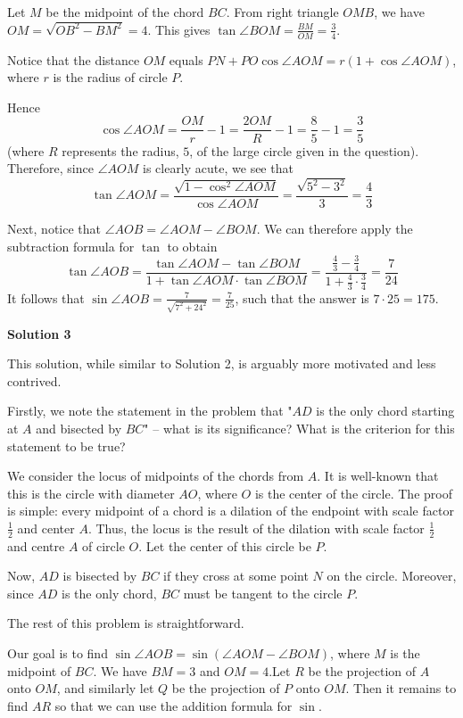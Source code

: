 \begin{enumerate}
 Let $M$ be the midpoint of the chord $BC$. From right triangle $OMB$, we have $OM = \sqrt{OB^2 - BM^2} =4$. This gives $\tan \angle BOM = \frac{BM}{OM} = \frac 3 4$.

 Notice that the distance $OM$ equals $PN + PO \cos \angle AOM = r(1 + \cos \angle AOM)$, where $r$ is the radius of circle $P$. 

 Hence 
 \[\cos \angle AOM = \frac{OM}{r} - 1 = \frac{2OM}{R} - 1 = \frac 8 5 - 1 = \frac 3 5\] (where $R$ represents the radius, $5$, of the large circle given in the question). Therefore, since $\angle AOM$ is clearly acute, we see that 
 \[\tan \angle AOM =\frac{\sqrt{1 - \cos^2 \angle AOM}}{\cos \angle AOM} = \frac{\sqrt{5^2 - 3^2}}{3} = \frac 4 3\]

 Next, notice that $\angle AOB = \angle AOM - \angle BOM$. We can therefore apply the subtraction formula for $\tan$ to obtain 
 \[\tan \angle AOB =\frac{\tan \angle AOM - \tan \angle BOM}{1 + \tan \angle AOM \cdot \tan \angle BOM} =\frac{\frac 4 3 - \frac 3 4}{1 + \frac 4 3 \cdot \frac 3 4} = \frac{7}{24}\] It follows that $\sin \angle AOB =\frac{7}{\sqrt{7^2+24^2}} = \frac{7}{25}$, such that the answer is $7 \cdot 25=\boxed{175}$.

 



\textbf{Solution 3}

This solution, while similar to Solution 2, is arguably more motivated and less contrived.

 Firstly, we note the statement in the problem that "$AD$ is the only chord starting at $A$ and bisected by $BC$" – what is its significance? What is the criterion for this statement to be true?

 We consider the locus of midpoints of the chords from $A$. It is well-known that this is the circle with diameter $AO$, where $O$ is the center of the circle. The proof is simple: every midpoint of a chord is a dilation of the endpoint with scale factor $\frac{1}{2}$ and center $A$. Thus, the locus is the result of the dilation with scale factor $\frac{1}{2}$ and centre $A$ of circle $O$. Let the center of this circle be $P$.

 Now, $AD$ is bisected by $BC$ if they cross at some point $N$ on the circle. Moreover, since $AD$ is the only chord, $BC$ must be tangent to the circle $P$.

 The rest of this problem is straightforward.

 Our goal is to find $\sin \angle AOB = \sin{\left(\angle AOM - \angle BOM\right)}$, where $M$ is the midpoint of $BC$. We have $BM=3$ and $OM=4$.Let $R$ be the projection of $A$ onto $OM$, and similarly let $Q$ be the projection of $P$ onto $OM$. Then it remains to find $AR$ so that we can use the addition formula for $\sin$.


\end{enumerate}
